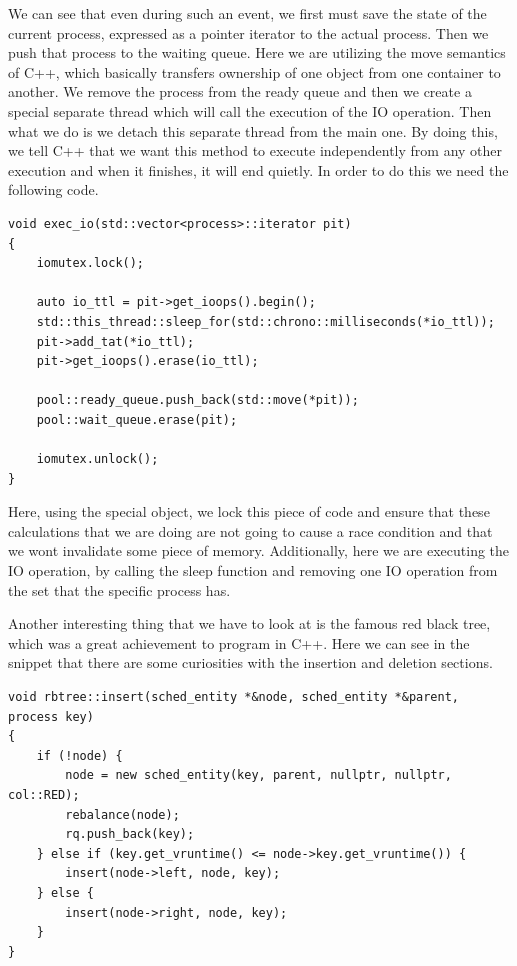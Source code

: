 \documentclass{article}
\newcommand{\code}[1]{\codeinline{\texttt{#1}}}
\begin{document}
We can see that even during such an event, we first must save the state of the current process, expressed as a pointer iterator to the actual process. Then we push that process to the waiting queue. Here we are utilizing the move semantics of C++, which basically transfers ownership of one object from one container to another. We remove the process from the ready queue and then we create a special separate thread which will call the execution of the IO operation. Then what we do is we detach this separate thread from the main one. By doing this, we tell C++ that we want this method to execute independently from any other execution and when it finishes, it will end quietly. In order to do this we need the following code.

\begin{lstlisting}
void exec_io(std::vector<process>::iterator pit)
{
    iomutex.lock();

    auto io_ttl = pit->get_ioops().begin();
    std::this_thread::sleep_for(std::chrono::milliseconds(*io_ttl));
    pit->add_tat(*io_ttl);
    pit->get_ioops().erase(io_ttl);

    pool::ready_queue.push_back(std::move(*pit));
    pool::wait_queue.erase(pit);

    iomutex.unlock();
}
\end{lstlisting}

Here, using the special \code{iomutex} object, we lock this piece of code and ensure that these calculations that we are doing are not going to cause a race condition and that we wont invalidate some piece of memory. Additionally, here we are executing the IO operation, by calling the sleep function and removing one IO operation from the set that the specific process has.

Another interesting thing that we have to look at is the famous red black tree, which was a great achievement to program in C++. Here we can see in the snippet that there are some curiosities with the insertion and deletion sections.

\begin{lstlisting}
void rbtree::insert(sched_entity *&node, sched_entity *&parent, process key)
{
    if (!node) {
        node = new sched_entity(key, parent, nullptr, nullptr, col::RED);
        rebalance(node);
        rq.push_back(key);
    } else if (key.get_vruntime() <= node->key.get_vruntime()) {
        insert(node->left, node, key);
    } else {
        insert(node->right, node, key);
    }
}
\end{lstlisting}
\end{document}
